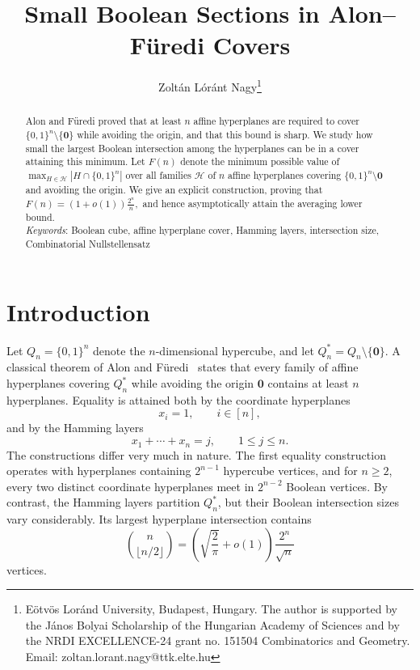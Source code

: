 \documentclass[11pt]{article}
\title{Small Boolean Sections in Alon–Füredi Covers}
\author{Zolt\'an L\'or\'ant Nagy\thanks{
		E\"otv\"os Lor\'and University, Budapest, Hungary. The author is supported by the J\'anos Bolyai Scholarship of the Hungarian Academy of Sciences and by the NRDI EXCELLENCE-24 grant no. 151504 Combinatorics and Geometry. Email: zoltan.lorant.nagy@ttk.elte.hu}}
\date{}
\newcommand{\Q}{Q}
\newcommand{\1}{\mathbf{1}}
\newcommand\cH{{\mathcal H}}
\begin{document}
	
	\maketitle
	\begin{abstract}
		Alon and F\"uredi proved that at least $n$ affine hyperplanes are required to cover $\{0,1\}^n\setminus\{\textbf{0}\}$ while avoiding the origin, and that this bound is sharp. We study how small the largest Boolean intersection among the hyperplanes can be in a cover attaining this minimum. Let $F(n)$ denote the minimum possible value of $\max_{H\in\mathcal H} |H\cap\{0,1\}^n|$ over all families $\cH$ of $n$ affine hyperplanes covering $\{0,1\}^n\setminus{\mathbf{0}}$ and avoiding the origin. %
		We give an explicit construction, proving that 
		$F(n)=(1+o(1))\frac{2^n}{n},$
		and hence asymptotically attain the averaging lower bound.\\
		\textit{Keywords}: {Boolean cube, affine hyperplane cover, Hamming layers,  intersection size, Combinatorial Nullstellensatz}
	\end{abstract}
	
	\maketitle
	
	\section{Introduction}
	
	Let $\Q_n=\{0,1\}^n$ denote the $n$-dimensional  hypercube, and let $\Q_n^*=\Q_n\setminus\{\textbf{0}\}$. A classical theorem of Alon and F\"uredi~\cite{AlonFuredi1993} states that every family of affine hyperplanes covering $\Q_n^*$ while avoiding the origin $\textbf{0}$ contains at least $n$ hyperplanes. %
	Equality is attained both by the coordinate hyperplanes
	\[
	x_i=1,\qquad i\in[n],
	\]
	and by the Hamming layers
	\[
	x_1+\cdots+x_n=j,\qquad 1\le j\le n.
	\]
	The constructions differ very much in nature. 
	The first equality construction operates with hyperplanes containing $2^{n-1}$ hypercube vertices, and  for \(n\geq2\), every two distinct coordinate hyperplanes meet in
	\(2^{n-2}\) Boolean vertices. By contrast, the Hamming layers partition
	\(Q_n^*\), but their Boolean intersection sizes vary considerably.  Its largest hyperplane intersection  contains
	\[
	\binom{n}{\lfloor n/2\rfloor}
	=\left(\sqrt{\frac{2}{\pi}}+o(1)\right)\frac{2^n}{\sqrt n}
	\]
	vertices.
	
\end{document}
